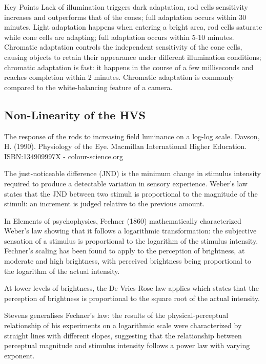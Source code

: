 Key Points
Lack of illumination triggers dark adaptation, rod cells sensitivity increases and outperforms that of the cones; full adaptation occurs within 30 minutes.
Light adaptation happens when entering a bright area, rod cells saturate while cone cells are adapting;  full adaptation occurs within 5-10 minutes.
Chromatic adaptation controls the independent sensitivity of the cone cells, causing objects to retain their appearance under different illumination conditions; chromatic adaptation is fast: it happens in the course of a few milliseconds and reaches completion within 2 minutes.
Chromatic adaptation is commonly compared to the white-balancing feature of a camera.

\subsection{Non-Linearity of the HVS}%
\label{subsec:non-linearity-of-the-hvs}

The response of the rods to increasing field luminance on a log-log scale. Davson, H. (1990). Physiology of the Eye. Macmillan International Higher Education. ISBN:134909997X - colour-science.org

The just-noticeable difference (JND) is the minimum change in stimulus intensity required to produce a detectable variation in sensory experience. Weber's law states that the JND between two stimuli is proportional to the magnitude of the stimuli: an increment is judged relative to the previous amount.

In Elements of psychophysics, Fechner (1860) mathematically characterized Weber’s law showing that it follows a logarithmic transformation: the subjective sensation of a stimulus is proportional to the logarithm of the stimulus intensity. Fechner’s scaling has been found to apply to the perception of brightness, at moderate and high brightness, with perceived brightness being proportional to the logarithm of the actual intensity.

At lower levels of brightness, the De Vries-Rose law applies which states that the perception of brightness is proportional to the square root of the actual intensity.

Stevens generalises Fechner's law: the results of the physical-perceptual relationship of his experiments on a logarithmic scale were characterized by straight lines with different slopes, suggesting that the relationship between perceptual magnitude and stimulus intensity follows a power law with varying exponent.



